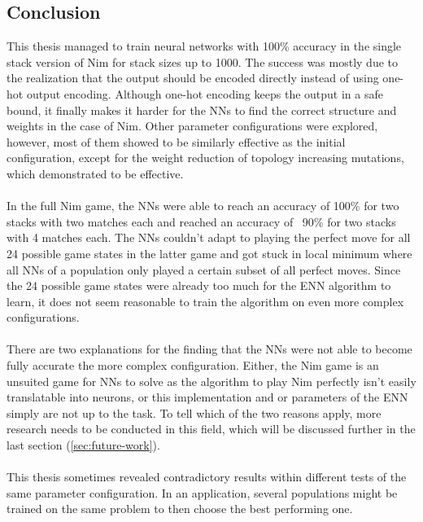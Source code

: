\documentclass[11pt]{report}
\begin{document}
\begin{enumerate}
    \section{Conclusion}\label{sec:conclusion}
    This thesis managed to train neural networks with 100\% accuracy in the single stack version of Nim for stack sizes up to 1000.
    The success was mostly due to the realization that the output should be encoded directly instead of using one-hot output encoding.
    Although one-hot encoding keeps the output in a safe bound, it finally makes it harder for the NNs to find the correct structure and weights in the case of Nim.
    Other parameter configurations were explored, however, most of them showed to be similarly effective as the initial configuration, except for the weight reduction of topology increasing mutations, which demonstrated to be effective.
    \\ \\
    In the full Nim game, the NNs were able to reach an accuracy of 100\% for two stacks with two matches each and reached an accuracy of ~90\% for two stacks with 4 matches each.
    The NNs couldn't adapt to playing the perfect move for all 24 possible game states in the latter game and got stuck in local minimum where all NNs of a population only played a certain subset of all perfect moves.
    Since the 24 possible game states were already too much for the ENN algorithm to learn, it does not seem reasonable to train the algorithm on even more complex configurations.
    \\\\
    There are two explanations for the finding that the NNs were not able to become fully accurate the more complex configuration.
    Either, the Nim game is an unsuited game for NNs to solve as the algorithm to play Nim perfectly isn't easily translatable into neurons, or this implementation and or parameters of the ENN simply are not up to the task.
    To tell which of the two reasons apply, more research needs to be conducted in this field, which will be discussed further in the last section (\ref{sec:future-work}).
    \\ \\
    This thesis sometimes revealed contradictory results within different tests of the same parameter configuration.
    In an application, several populations might be trained on the same problem to then choose the best performing one.



\end{enumerate}
\end{document}
